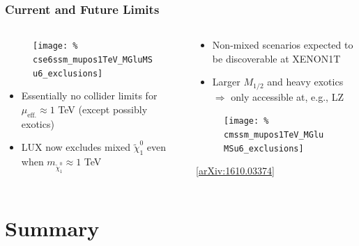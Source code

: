 \documentclass[10pt,aspectratio=169]{beamer}
\begin{document}
\begin{frame}
  \frametitle{Current and Future Limits}
  \begin{columns}[t]
    \begin{column}{0.5\textwidth}
      \vspace{-12pt}
      \begin{figure}
        \texttt{[image: \%
          cse6ssm\_mupos1TeV\_MGluMSu6\_exclusions]}
      \end{figure}
      \vspace*{-8pt}
      \begin{itemize}\itemsep1em
        \item Essentially no collider limits for $\mu_{\text{eff.}}
          \approx 1$ TeV ({\color{blue}except possibly exotics})
        \item {\color{red} LUX now excludes mixed
          $\tilde{\chi}_1^0$ even when $m_{\tilde{\chi}_1^0} \approx 1$ TeV}
      \end{itemize}
    \end{column}
    \begin{column}{0.5\textwidth}
      \vspace{-12pt}
      \begin{itemize}\itemsep1em
        \item Non-mixed scenarios expected to be discoverable at
          XENON1T
        \item Larger $M_{1/2}$ and heavy exotics $\Rightarrow$ only
          accessible at, e.g., LZ
      \end{itemize}
      \begin{figure}
        \texttt{[image: \%
          cmssm\_mupos1TeV\_MGluMSu6\_exclusions]}
      \end{figure}
      \vspace{-20pt}
      \begin{center}
        \tiny [\href{https://arxiv.org/abs/1610.03374}{arXiv:1610.03374}]
      \end{center}
    \end{column}
  \end{columns}
\end{frame}

\section{Summary}
\end{document}
